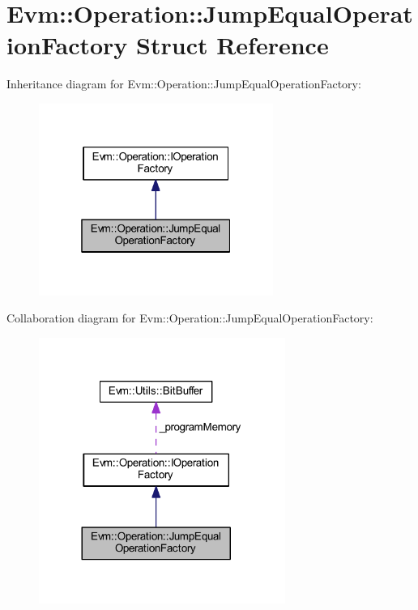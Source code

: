 \hypertarget{struct_evm_1_1_operation_1_1_jump_equal_operation_factory}{}\section{Evm\+:\+:Operation\+:\+:Jump\+Equal\+Operation\+Factory Struct Reference}
\label{struct_evm_1_1_operation_1_1_jump_equal_operation_factory}


Inheritance diagram for Evm\+:\+:Operation\+:\+:Jump\+Equal\+Operation\+Factory\+:
\nopagebreak
\begin{figure}[H]
\begin{center}
\leavevmode
\includegraphics[width=217pt]{struct_evm_1_1_operation_1_1_jump_equal_operation_factory__inherit__graph}
\end{center}
\end{figure}


Collaboration diagram for Evm\+:\+:Operation\+:\+:Jump\+Equal\+Operation\+Factory\+:
\nopagebreak
\begin{figure}[H]
\begin{center}
\leavevmode
\includegraphics[width=228pt]{struct_evm_1_1_operation_1_1_jump_equal_operation_factory__coll__graph}
\end{center}
\end{figure}
